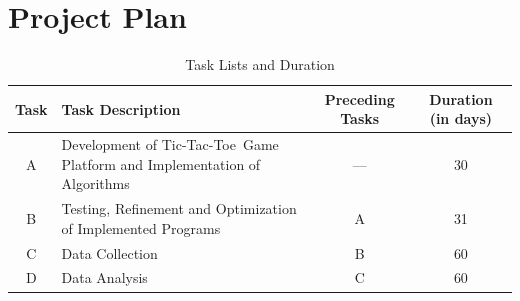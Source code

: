 \documentclass{strrespaper-trad}
\newcommand{\ttt}{Tic-Tac-Toe}
\begin{document}
	\literaturecited

	\appendix

	\chapter{Project Plan}
		\begin{table}[htbp]
			\centering
			\caption{Task Lists and Duration}
			\label{tab:task_lists_duration}
			\begin{tabularx}{\linewidth}{cXcc}
				\toprule
				Task & Task Description                                                    & Preceding Tasks & Duration (in days) \\
				\midrule
				A    & Development of \ttt\ Game Platform and Implementation of Algorithms & ---             & 30                 \\
				B    & Testing, Refinement and Optimization of Implemented Programs        & A               & 31                 \\
				C    & Data Collection                                                     & B               & 60                 \\
				D    & Data Analysis                                                       & C               & 60                 \\
				\bottomrule
			\end{tabularx}
		\end{table}
\end{document}
